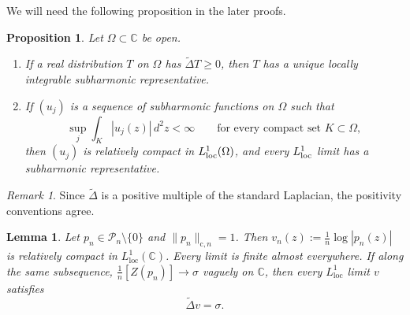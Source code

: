 \documentclass[10pt,reqno]{amsart}
\newtheorem{proposition}[theorem]{Proposition}
\newtheorem{lemma}[theorem]{Lemma}
\theoremstyle{remark}
\newtheorem{remark}[theorem]{Remark}
\newcommand{\C}{\mathbb C}
\begin{document}
We will need the following proposition in the later proofs. 

\begin{proposition}\cite{Dem12}\label{prop:subharmonic-tools}
    Let $\Omega\subset \C$ be open.
    \begin{enumerate}
        \item[(1)][Theorem 4.20] If a real distribution $T$ on $\Omega$ has $\widetilde{\Delta}T\ge 0$, then $T$ has a unique locally integrable subharmonic representative.
        \item[(2)][Proposition 4.21] If $(u_j)$ is a sequence of subharmonic functions on $\Omega$ such that 
        \[\sup_j \int_K|u_j(z)|\, d^2z<\infty\qquad\text{for every compact set }K\subset \Omega,\]
        then $(u_j)$ is relatively compact in $L_{\rm loc}^1(\Omega)$, and every $L_{\rm loc}^1$ limit has a subharmonic representative.
    \end{enumerate}
\end{proposition}
\begin{remark}
    Since $\widetilde{\Delta}$ is a positive multiple of the standard Laplacian, the positivity conventions agree.
\end{remark}

\begin{lemma}\label{lem:polynomial-compactness}
    Let $p_n\in\mathcal P_n\setminus\{0\}$ and $\|p_n\|_{\mathrm c,n}=1$.  Then $v_n(z):=\frac1n\log|p_n(z)|$ is relatively compact in $L^1_{\mathrm{loc}}(\C)$.  Every limit is finite almost everywhere. If along the same subsequence, $\frac{1}{n}[Z(p_n)] \to \sigma$ vaguely on $\C$, then every $L^1_{\mathrm{loc}}$ limit $v$ satisfies 
    \[\widetilde{\Delta}v=\sigma.\]
\end{lemma}
\end{document}
